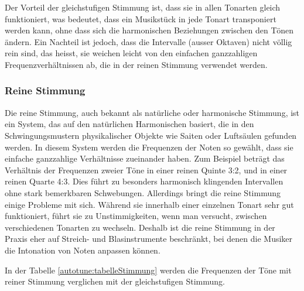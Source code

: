 Der Vorteil der gleichstufigen Stimmung ist, dass sie in allen Tonarten gleich funktioniert, was bedeutet,
dass ein Musikstück in jede Tonart transponiert werden kann, ohne dass sich die harmonischen Beziehungen zwischen den Tönen ändern.
Ein Nachteil ist jedoch, dass die Intervalle (ausser Oktaven) nicht völlig rein sind, das heisst,
sie weichen leicht von den einfachen ganzzahligen Frequenzverhältnissen ab, die in der reinen Stimmung verwendet werden.

\subsubsection{Reine Stimmung
\label{autotune:subsubsection:reineStimmung}}
Die reine Stimmung, auch bekannt als natürliche oder harmonische Stimmung, ist ein System,
das auf den natürlichen Harmonischen basiert, die in den Schwingungsmustern physikalischer Objekte wie Saiten oder Luftsäulen gefunden werden.
In diesem System werden die Frequenzen der Noten so gewählt, dass sie einfache ganzzahlige Verhältnisse zueinander haben.
Zum Beispiel beträgt das Verhältnis der Frequenzen zweier Töne in einer reinen Quinte 3:2, und in einer reinen Quarte 4:3.
Dies führt zu besonders harmonisch klingenden Intervallen ohne stark bemerkbaren Schwebungen.
Allerdings bringt die reine Stimmung einige Probleme mit sich.
Während sie innerhalb einer einzelnen Tonart sehr gut funktioniert, führt sie zu Unstimmigkeiten,
wenn man versucht, zwischen verschiedenen Tonarten zu wechseln.
Deshalb ist die reine Stimmung in der Praxis eher auf Streich- und Blasinstrumente beschränkt,
bei denen die Musiker die Intonation von Noten anpassen können.

In der Tabelle \ref{autotune:tabelleStimmung} werden die Frequenzen der Töne mit reiner Stimmung verglichen mit der gleichstufigen Stimmung.


